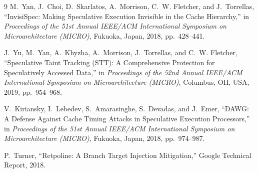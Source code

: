 \documentclass[11pt,a4paper]{article}
\begin{document}
\begin{thebibliography}{9}
M.~Yan, J.~Choi, D.~Skarlatos, A.~Morrison, C.~W. Fletcher, and J.~Torrellas,
``InvisiSpec: Making Speculative Execution Invisible in the Cache
Hierarchy,'' in \textit{Proceedings of the 51st Annual IEEE/ACM International
Symposium on Microarchitecture (MICRO)}, Fukuoka, Japan, 2018, pp.~428--441.

J.~Yu, M.~Yan, A.~Khyzha, A.~Morrison, J.~Torrellas, and C.~W. Fletcher,
``Speculative Taint Tracking (STT): A Comprehensive Protection for
Speculatively Accessed Data,'' in \textit{Proceedings of the 52nd Annual
IEEE/ACM International Symposium on Microarchitecture (MICRO)}, Columbus, OH,
USA, 2019, pp.~954--968.

V.~Kiriansky, I.~Lebedev, S.~Amarasinghe, S.~Devadas, and J.~Emer, ``DAWG: A
Defense Against Cache Timing Attacks in Speculative Execution Processors,''
in \textit{Proceedings of the 51st Annual IEEE/ACM International Symposium
on Microarchitecture (MICRO)}, Fukuoka, Japan, 2018, pp.~974--987.

P.~Turner, ``Retpoline: A Branch Target Injection Mitigation,'' Google
Technical Report, 2018.

\end{thebibliography}
\end{document}

